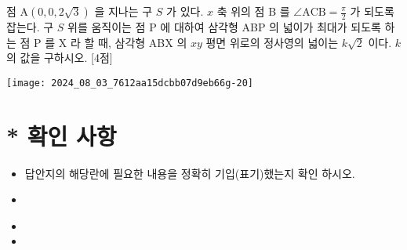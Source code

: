 \documentclass[10pt]{article}
\begin{document}
점 \(\mathrm{A}(0,0,2 \sqrt{3})\) 을 지나는 구 \(S\) 가 있다. \(x\) 축 위의 점 B 를 \(\angle \mathrm{ACB}=\frac{\pi}{2}\) 가 되도록 잡는다. 구 \(S\) 위를 움직이는 점 P 에 대하여 삼각형 ABP 의 넓이가 최대가 되도록 하는 점 P 를 X 라 할 때, 삼각형 ABX 의 \(x y\) 평면 위로의 정사영의 넓이는 \(k \sqrt{2}\) 이다. \(k\) 의 값을 구하시오. [4점]

\begin{center}
\texttt{[image: 2024\_08\_03\_7612aa15dcbb07d9eb66g-20]}
\end{center}

\section*{* 확인 사항}
\begin{itemize}
  \item 답안지의 해당란에 필요한 내용을 정확히 기입(표기)했는지 확인 하시오.
\end{itemize}

\begin{itemize}
  \item 
\end{itemize}

\begin{itemize}
  \item 
  \item 
\end{itemize}
\end{document}
